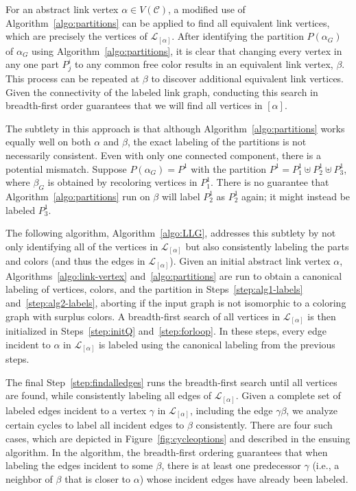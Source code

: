 \documentclass{amsart}
\theoremstyle{hypothesisstyle}
\theoremstyle{definition}
\theoremstyle{remark}
\numberwithin{equation}{section}
\newcommand{\C}{\mathcal C}
\begin{document}
For an abstract link vertex $\alpha\in V(\C)$, a modified use of Algorithm~\ref{algo:partitions} can be applied to find all equivalent link vertices, which are precisely the vertices of $\mathcal{L}_{[\alpha]}$.  After identifying the partition $P(\alpha_G)$ of $\alpha_G$ using Algorithm~\ref{algo:partitions}, it is clear that changing every vertex in any one part $P^i_j$ to any common free color results in an equivalent link vertex, $\beta$.  This process can be repeated at $\beta$ to discover additional equivalent link vertices. Given the connectivity of the labeled link graph, conducting this search in breadth-first order guarantees that we will find all vertices in $[\alpha]$.

The subtlety in this approach is that although Algorithm~\ref{algo:partitions} works equally well on both $\alpha$ and $\beta$, the exact labeling of the partitions is not necessarily consistent.  Even with only one connected component, there is a potential mismatch. Suppose $P(\alpha_G)=P^1$ with the partition $P^1=P^1_1\uplus P^1_2 \uplus P^1_3$, where $\beta_G$ is obtained by recoloring vertices in $P^1_1$. There is no guarantee that Algorithm~\ref{algo:partitions} run on $\beta$ will label $P^1_2$ as $P^1_2$ again; it might instead be labeled $P^1_3$. 

The following algorithm, Algorithm~\ref{algo:LLG}, addresses this subtlety by not only identifying all of the vertices in $\mathcal{L}_{[\alpha]}$ but also consistently labeling the parts and colors (and thus the edges in $\mathcal{L}_{[\alpha]}$).   Given an initial abstract link vertex $\alpha$, Algorithms~\ref{algo:link-vertex} and~\ref{algo:partitions} are run to obtain a canonical labeling of vertices, colors, and the partition in Steps~\ref{step:alg1-labels} and~\ref{step:alg2-labels}, aborting if the input graph is not isomorphic to a coloring graph with surplus colors. A breadth-first search of all vertices in $\mathcal{L}_{[\alpha]}$ is then initialized in Steps~\ref{step:initQ} and~\ref{step:forloop}.  In these steps, every edge incident to $\alpha$ in $\mathcal{L}_{[\alpha]}$ is labeled using the canonical labeling from the previous steps.  

The final Step~\ref{step:findalledges} runs the breadth-first search until all vertices are found, while consistently labeling all edges of $\mathcal{L}_{[\alpha]}$. Given a complete set of labeled edges incident to a vertex $\gamma$ in $\mathcal{L}_{[\alpha]}$, including the edge $\gamma\beta$, we analyze certain cycles to label all incident edges to $\beta$ consistently. There are four such cases, which are depicted in Figure~\ref{fig:cycleoptions} and described in the ensuing algorithm. In the algorithm, the breadth-first ordering guarantees that when labeling the edges incident to some $\beta$, there is at least one predecessor $\gamma$ (i.e., a neighbor of $\beta$ that is closer to $\alpha$) whose incident edges have already been labeled.  
\end{document}
